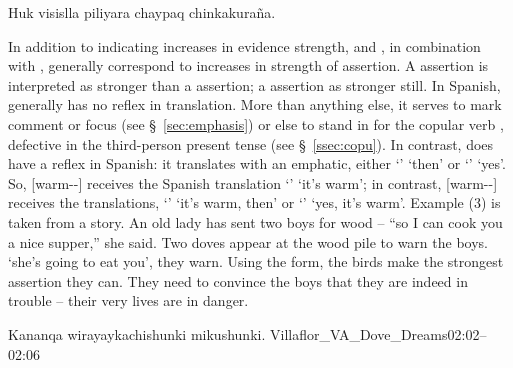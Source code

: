 %
{Huk visislla piliyara chaypaq chinkakura\~na.}%
{}%
{}{}%

In addition to indicating increases in evidence strength,  and , in combination with , generally correspond to increases in strength of assertion. A  assertion is interpreted as stronger than a  assertion; a  assertion as stronger still. In Spanish,  generally has no reflex in translation. More than anything else, it serves to mark comment or focus (see \S~\ref{sec:emphasis}) or else to stand in for the copular verb , defective in the third-person present tense (see \S~\ref{ssec:copu}). In contrast,  does have a reflex in Spanish: it translates with an emphatic, either `' `then' or `' `yes'. So,  [warm--\uo{}] receives the Spanish translation `' `it's warm'; in contrast,  [warm--] receives the translations, `' `it's warm, then' or `' `yes, it's warm'. Example (3) is taken from a story. An old lady has sent two boys for wood -- ``so I can cook you a nice supper,'' she said. Two doves appear at the wood pile to warn the boys.  `she's going to eat you', they warn. Using the  form, the birds make the strongest assertion they can. They need to convince the boys that they are indeed in trouble -- their very lives are in danger.

%
{Kananqa wirayaykachishunki mikushunki.}%
{}%
{Villaflor\_VA\_Dove\_Dreams}{02:02--02:06}%

